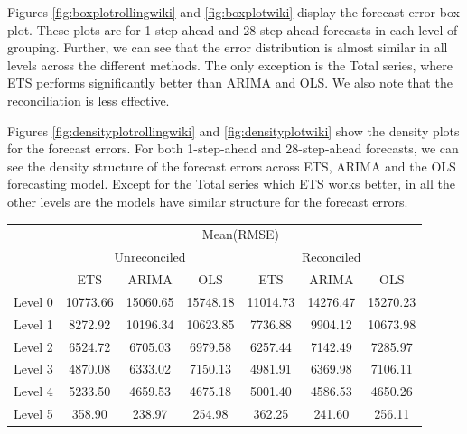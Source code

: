 \documentclass[11pt,a4paper,]{article}
\let\origtable\table
\let\endorigtable\endtable
\renewenvironment{table}[1][2] {
    \expandafter\origtable\expandafter[htbp]
} {
    \endorigtable
}
\begin{document}
Figures \ref{fig:boxplotrollingwiki} and \ref{fig:boxplotwiki} display the forecast error box plot. These plots are for 1-step-ahead and 28-step-ahead forecasts in each level of grouping. Further, we can see that the error distribution is almost similar in all levels across the different methods. The only exception is the Total series, where ETS performs significantly better than ARIMA and OLS. We also note that the reconciliation is less effective.

Figures \ref{fig:densityplotrollingwiki} and \ref{fig:densityplotwiki} show the density plots for the forecast errors. For both 1-step-ahead and 28-step-ahead forecasts, we can see the density structure of the forecast errors across ETS, ARIMA and the OLS forecasting model. Except for the Total series which ETS works better, in all the other levels are the models have similar structure for the forecast errors.

\begin{table}[t]

\caption{\label{tab:wikipediadataresulrolling}Mean(RMSE) for ETS, ARIMA and OLS with and without reconciliation - 1-step-ahead - Wikipedia dataset}
\centering
\begin{tabular}{ccccccc}
\toprule
\multicolumn{1}{c}{} & \multicolumn{6}{c}{Mean(RMSE)} \\
\cmidrule(l{3pt}r{3pt}){2-7}
\multicolumn{1}{c}{} & \multicolumn{3}{c}{Unreconciled} & \multicolumn{3}{c}{Reconciled} \\
\cmidrule(l{3pt}r{3pt}){2-4} \cmidrule(l{3pt}r{3pt}){5-7}
 & ETS & ARIMA & OLS & ETS & ARIMA & OLS\\
\midrule
Level 0 & 10773.66 & 15060.65 & 15748.18 & 11014.73 & 14276.47 & 15270.23\\
Level 1 & 8272.92 & 10196.34 & 10623.85 & 7736.88 & 9904.12 & 10673.98\\
Level 2 & 6524.72 & 6705.03 & 6979.58 & 6257.44 & 7142.49 & 7285.97\\
Level 3 & 4870.08 & 6333.02 & 7150.13 & 4981.91 & 6369.98 & 7106.11\\
Level 4 & 5233.50 & 4659.53 & 4675.18 & 5001.40 & 4586.53 & 4650.26\\
Level 5 & 358.90 & 238.97 & 254.98 & 362.25 & 241.60 & 256.11\\
\bottomrule
\end{tabular}
\end{table}
\end{document}
